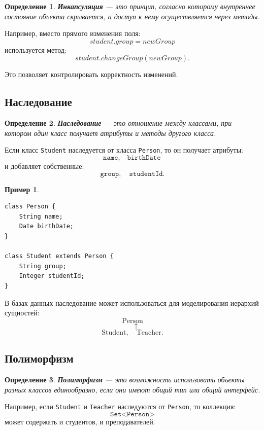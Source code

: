 \documentclass[12pt,a4paper]{article}
\newtheorem{definition}{Определение}[section]
\newtheorem{example}{Пример}[section]
\theoremstyle{remark}
\begin{document}
\begin{definition}
\textbf{Инкапсуляция} --- это принцип, согласно которому внутреннее состояние объекта скрывается, а доступ к нему осуществляется через методы.
\end{definition}

Например, вместо прямого изменения поля:
\[
student.group = newGroup
\]
используется метод:
\[
student.changeGroup(newGroup).
\]

Это позволяет контролировать корректность изменений.

\subsection{Наследование}

\begin{definition}
\textbf{Наследование} --- это отношение между классами, при котором один класс получает атрибуты и методы другого класса.
\end{definition}

Если класс \texttt{Student} наследуется от класса \texttt{Person}, то он получает атрибуты:
\[
\texttt{name},\quad \texttt{birthDate}
\]
и добавляет собственные:
\[
\texttt{group},\quad \texttt{studentId}.
\]

\begin{example}
\begin{lstlisting}[style=sqlstyle]
class Person {
    String name;
    Date birthDate;
}

class Student extends Person {
    String group;
    Integer studentId;
}
\end{lstlisting}
\end{example}

В базах данных наследование может использоваться для моделирования иерархий сущностей:
\[
\text{Person}
\]
\[
\quad \uparrow
\]
\[
\text{Student},\quad \text{Teacher}.
\]

\subsection{Полиморфизм}

\begin{definition}
\textbf{Полиморфизм} --- это возможность использовать объекты разных классов единообразно, если они имеют общий тип или общий интерфейс.
\end{definition}

Например, если \texttt{Student} и \texttt{Teacher} наследуются от \texttt{Person}, то коллекция:
\[
\texttt{Set<Person>}
\]
может содержать и студентов, и преподавателей.
\end{document}
